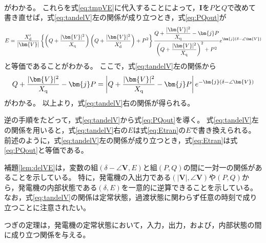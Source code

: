 \documentclass[tombow,dvipdfmx]{corona-a5-1.1}
\begin{document}
\begin{証明}
\begin{align*}
\end{align*}
がわかる。
これらを式\ref{eq:tmpVE}に代入することによって，$\bm{I}$を$P$と$Q$で改めて書き直せば，式\ref{eq:tandelV}左の関係が成り立つとき，式\ref{eq:PQout}が
\begin{align}\label{eq:Etran}
E=
\frac{X_{\rm d}'}{|\bm{V}| } 
\left\{
\left(Q + \frac{|\bm{V}|^2}{X_{\rm q}} \right) \left(Q + \frac{|\bm{V}|^2}{X_{\rm d}'} \right) +P^2
\right\}
\frac{  Q + \frac{|\bm{V}|^2}{X_{\rm q}} - \bm{j} P }
{   \left( Q + \frac{|\bm{V}|^2}{X_{\rm q}} \right)^2 + P^2   }
e^{\bm{j}(\delta - \angle \bm{V})}
\end{align}
と等価であることがわかる。
ここで，式\ref{eq:tandelV}左の関係から
\begin{align*}
Q + \frac{|\bm{V}|^2}{X_{\rm q}} - \bm{j} P
= 
\left|Q + \frac{|\bm{V}|^2}{X_{\rm q}} - \bm{j} P \right|
e^{-\bm{j}(\delta - \angle \bm{V})}
\end{align*}
がわかる。
以上より，式\ref{eq:tandelV}右の関係が得られる。

逆の手順をたどって，式\ref{eq:tandelV}から式\ref{eq:PQout}を導く。
式\ref{eq:tandelV}左の関係を用いると，式\ref{eq:tandelV}右の$E$は式\ref{eq:Etran}の$E$で書き換えられる。
前述のように，式\ref{eq:tandelV}左の関係が成り立つとき，式\ref{eq:Etran}は式\ref{eq:PQout}と等価である。
\end{証明}

補題\ref{lem:delVE}は，変数の組$(\delta - \angle \bm{V},E)$と組$(P,Q)$の間に一対一の関係があることを示している。
特に，発電機の入出力である$(|\bm{V}|,\angle \bm{V})$や$(P,Q)$から，発電機の内部状態である$(\delta,E)$を一意的に逆算できることを示している。
なお，式\ref{eq:tandelV}の関係は定常状態，過渡状態に関わらず任意の時刻で成り立つことに注意されたい。

つぎの定理は，発電機の定常状態において，入力，出力，および，内部状態の間に成り立つ関係を与える。
\end{document}
